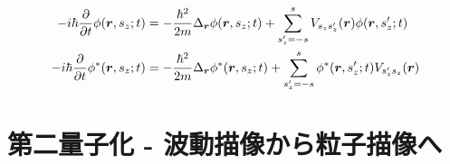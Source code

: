 \documentclass[uplatex,dvipdfmx,a4paper,11pt]{jlreq}
\newcommand{\rr}{\bm{r}}
\numberwithin{equation}{section}
\theoremstyle{definition}
\begin{document}
\begin{align}
  -i\hbar\diffp{}{t}\phi(\rr, s_z; t)   & = -\frac{\hbar^2}{2m}\Delta_{\rr}\phi(\rr, s_z; t) + \sum_{s_z' = -s}^{s}V_{s_zs_z'}(\rr)\phi(\rr, s_z'; t)     \\
  -i\hbar\diffp{}{t}\phi^*(\rr, s_z; t) & = -\frac{\hbar^2}{2m}\Delta_{\rr}\phi^*(\rr, s_z; t) + \sum_{s_z' = -s}^{s}\phi^*(\rr, s_z'; t)V_{s_z's_z}(\rr)
\end{align}

\section{第二量子化 - 波動描像から粒子描像へ}
\end{document}

